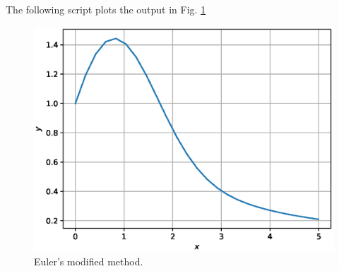 \documentclass[journal,12pt,twocolumn]{IEEEtran}
\begin{document}
\solution
 The following script plots the output in Fig. \ref{fig:euler_modified}

\begin{figure}[!h]
\centering
\includegraphics[width=\columnwidth]{./figs/euler_modified.eps}
\caption{Euler's modified method.}
\label{fig:euler_modified}
\end{figure}
%
\end{document}
